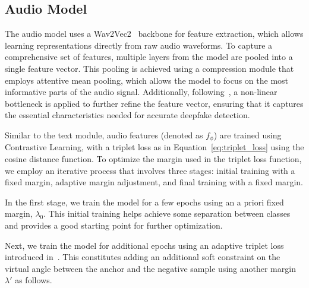 \documentclass{Interspeech}
\begin{document}
\subsection{Audio Model}

The audio model uses a Wav2Vec2~\cite{wav2vec2} backbone for feature
extraction, which allows learning representations directly from raw audio
waveforms. To capture a comprehensive set of features, multiple layers from the
model are pooled into a single feature vector. This pooling is achieved using a
compression module that employs attentive mean pooling, which allows the model
to focus on the most informative parts of the audio signal. Additionally,
following~\cite{slim}, a non-linear bottleneck is applied to further refine the
feature vector, ensuring that it captures the essential characteristics needed
for accurate deepfake detection. 
% 


Similar to the text module, audio features (denoted as $f_{\phi}$) are trained using Contrastive
Learning, with a triplet loss as in Equation~\ref{eq:triplet_loss} using the
cosine distance function. To optimize the margin used in the triplet loss
function, we employ an iterative process that involves three stages: initial
training with a fixed margin, adaptive margin adjustment, and final training
with a fixed margin.

In the first stage, we train the model for a few epochs using an a priori fixed
margin, $\lambda_0$. This initial training helps achieve some separation
between classes and provides a good starting point for further optimization.

Next, we train the model for additional epochs using an adaptive triplet loss
introduced in~\cite{adatriplet}.  This
constitutes adding an additional soft constraint on the virtual angle between
the anchor and the negative sample using another margin $\lambda'$ as follows.
\end{document}
